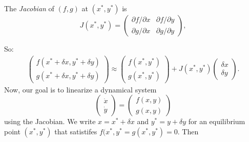 \begin{definition}
The \emph{Jacobian} of $(f,g)$ at $(x^*,y^*)$ is
\[
J(x^*,y^*) = \begin{pmatrix} \partial f/\partial x & \partial f/\partial y \\ \partial g/\partial x & \partial g/\partial y \end{pmatrix},
\]
\end{definition}
So:
\begin{align}\label{eq:linear approximation}
\begin{pmatrix} f(x^*+\delta x,y^*+\delta y) \\ g(x^*+\delta x,y^*+\delta y) \end{pmatrix}
\approx
\begin{pmatrix} f(x^*,y^*) \\ g(x^*,y^*) \end{pmatrix}
+
J(x^*, y^*) \begin{pmatrix} \delta x \\ \delta y \end{pmatrix}.
\end{align}
Now, our goal is to linearize a dynamical system 
\[
\begin{pmatrix} \dot x \\ \dot y \end{pmatrix} = \begin{pmatrix} f(x,y) \\ g(x,y) \end{pmatrix}
\]
using the Jacobian. We write $x = x^* + \delta x$ and $y^* = y +
\delta y$ for an equilibrium point $(x^*,y^*)$ that satistifes
$f(x^*,y^*=g(x^*,y^*)=0$.  Then

